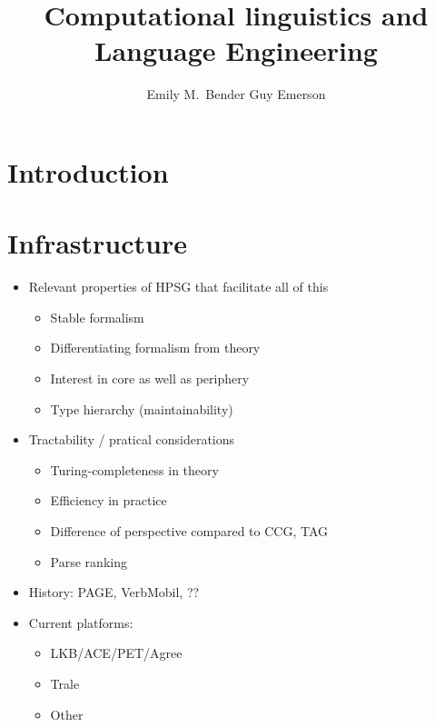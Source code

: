 \documentclass[output=paper]{langsci/langscibook}
\author{%
	Emily M.\ Bender\affiliation{University of Washington} \lastand
Guy Emerson\affiliation{Cambridge University}
}
\title{Computational linguistics and Language Engineering}
\begin{document}


\section{Introduction}


\section{Infrastructure}


\begin{itemize}
\item Relevant properties of HPSG that facilitate all of this  %

    \begin{itemize}
    \item Stable formalism
    \item Differentiating formalism from theory
    \item Interest in core as well as periphery
    \item Type hierarchy (maintainability)
    \end{itemize}

\item Tractability / pratical considerations  %
    \begin{itemize}
    \item Turing-completeness in theory
    \item Efficiency in practice
    \item Difference of perspective compared to CCG, TAG
    \item Parse ranking
    \end{itemize}

\item History: PAGE, VerbMobil, ?? %
\item Current platforms:
    \begin{itemize}
    \item LKB/ACE/PET/Agree
    \item Trale
    \item Other
    \end{itemize}
\end{itemize}
\end{document}
